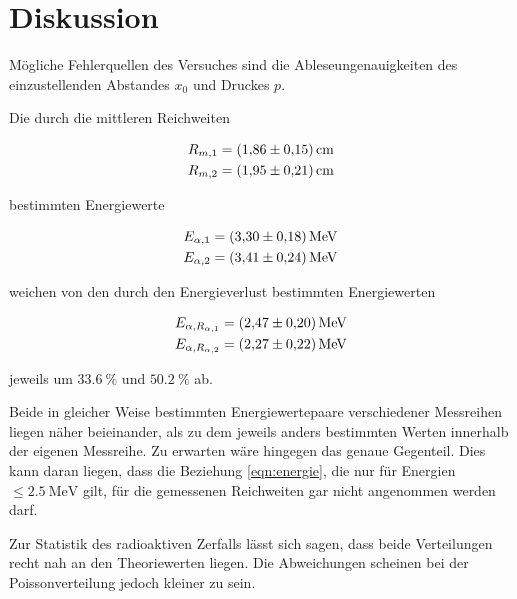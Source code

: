 \section{Diskussion}
\label{sec:Diskussion}

Mögliche Fehlerquellen des Versuches sind die Ableseungenauigkeiten des
einzustellenden Abstandes $x_0$ und Druckes $p$.

Die durch die mittleren Reichweiten

\begin{align*}
    R_{m,1} &= \SI{1.86 +- 0.15}{\centi\meter} \\
    R_{m,2} &= \SI{1.95 +- 0.21}{\centi\meter}
\end{align*}

bestimmten Energiewerte

\begin{align*}
    E_{\alpha, 1} &= \SI{3.30 +- 0.18}{\mega\eV} \\
    E_{\alpha, 2} &= \SI{3.41 +- 0.24}{\mega\eV}
\end{align*}

weichen von den durch den Energieverlust bestimmten Energiewerten

\begin{align*}
    E_{\alpha, R_{\alpha, 1}} &= \SI{2.47 +- 0.20}{\mega\eV} \\
    E_{\alpha, R_{\alpha, 2}} &= \SI{2.27 +- 0.22}{\mega\eV}
\end{align*}

jeweils um $\SI{33.6}{\percent}$ und $\SI{50.2}{\percent}$ ab.

Beide  in gleicher Weise bestimmten Energiewertepaare verschiedener Messreihen liegen näher beieinander, als 
zu dem jeweils anders bestimmten Werten innerhalb der eigenen Messreihe.
Zu erwarten wäre hingegen das genaue Gegenteil. Dies kann daran liegen, dass die Beziehung \eqref{eqn:energie},
die nur für Energien $\leq \SI{2.5}{\mega\eV}$ gilt, für die gemessenen Reichweiten gar nicht angenommen werden
darf.  

Zur Statistik des radioaktiven Zerfalls lässt sich sagen, dass beide Verteilungen recht nah an den Theoriewerten
liegen. Die Abweichungen scheinen bei der Poissonverteilung jedoch kleiner zu sein.

